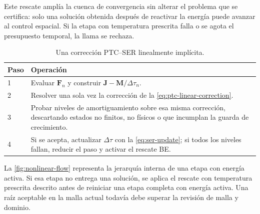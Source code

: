 \documentclass[12pt,a4paper,twoside,openany]{book}
\newcommand{\vect}[1]{\bm{#1}}
\newcommand{\mat}[1]{\bm{#1}}
\begin{document}
Este rescate amplía la cuenca de convergencia sin alterar el problema que se
certifica: solo una solución obtenida después de reactivar la energía puede
avanzar al control espacial. Si la etapa con temperatura prescrita falla o se
agota el presupuesto temporal, la llama se rechaza.

\begin{table}[htbp]
\centering
\caption{Una corrección PTC--SER linealmente implícita.}
\label{alg:ptc-step}
\begin{tabularx}{\textwidth}{@{}p{}Y@{}}
\toprule
\textbf{Paso} & \textbf{Operación} \\
 & Evaluar \(\vect F_n\) y construir
\(\mat J-\mat M/\Delta\tau_n\). \\
2 & Resolver una sola vez la corrección de la \cref{eq:ptc-linear-correction}. \\
3 & Probar niveles de amortiguamiento sobre esa misma corrección, descartando
estados no finitos, no físicos o que incumplan la guarda de crecimiento. \\
4 & Si se acepta, actualizar \(\Delta\tau\) con la \cref{eq:ser-update}; si todos
los niveles fallan, reducir el paso y activar el rescate BE. \\
\bottomrule
\end{tabularx}
\end{table}

La \cref{fig:nonlinear-flow} representa la jerarquía interna de una etapa con
energía activa. Si esa etapa no entrega una solución, se aplica el rescate con
temperatura prescrita descrito antes de reiniciar una etapa completa con energía
activa. Una raíz aceptable en la malla actual todavía debe superar la revisión
de malla y dominio.
\end{document}
